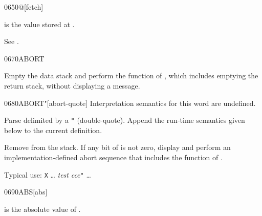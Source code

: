 \vspace*{-1ex}
\begin{worddef}{0650}{@}[fetch]
\item {}

	 is the value stored at .


	\begin{testing} %
		See .
	\end{testing}
\end{worddef}

\vspace*{-1ex}
\begin{worddef}{0670}{ABORT}
\item {}

	Empty the data stack and perform the function of ,
	which includes emptying the return stack, without displaying
	a message.

\end{worddef}


\begin{worddef}[ABORTq]{0680}{ABORT"}[abort-quote]
\interpret
	Interpretation semantics for this word are undefined.

\compile

	Parse  delimited by a \texttt{"} (double-quote).
	Append the run-time semantics given below to the current
	definition.

\runtime

	Remove  from the stack. If any bit of  is not
	zero, display  and perform an implementation-defined
	abort sequence that includes the function of .


	\begin{rationale} %
		Typical use:
			\word{:} \texttt{X} {\ldots}
				\emph{test}  \emph{ccc}\texttt{"}
			{\ldots} \word{;}
	\end{rationale}
\end{worddef}

\enlargethispage{4ex}
\begin{worddef}{0690}{ABS}[abs]
\item {}

	 is the absolute value of .

	\begin{testing} %
		 \\
		 \\
		 \\
	\end{testing}
\end{worddef}


